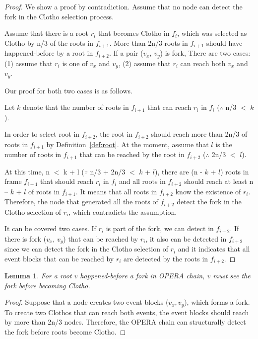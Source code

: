 \documentclass{article}
\newtheorem{lem}[thm]{Lemma}
\begin{document}
\begin{proof}
We show a proof by contradiction. Assume that no node can detect the fork in the Clotho selection process.

Assume that there is a root $r_i$ that becomes Clotho in $f_i$, which was selected as Clotho by n/3 of the roots in $f_{i+1}$. More than 2n/3 roots in $f_{i+1}$ should have happened-before by a root in $f_{i+2}$. 
If a pair ($v_x$, $v_y$) is fork, There are two cases: (1) assume that $r_i$ is one of $v_x$ and $v_y$, (2) assume that $r_i$ can reach both $v_x$ and $v_y$.

Our proof for both two cases is as follows. 

Let $k$ denote that the number of roots in $f_{i+1}$ that can reach $r_i$ in $f_{i}$ ($\therefore$ n/3 $<$ $k$).

In order to select root in $f_{i+2}$, the root in $f_{i+2}$ should reach more than 2n/3 of roots in $f_{i+1}$ by Definition~\ref{def:root}. At the moment, assume that $l$ is the number of roots in $f_{i+1}$ that can be reached by the root in $f_{i+2}$ ($\therefore$ 2n/3 $<$ $l$).

At this time, n $<$ k + l ($\because$ n/3 + 2n/3 $<$ $k$ + $l$), there are (n - $k$ + $l$) roots in frame $f_{i+1}$ that should reach $r_i$ in $f_i$ and all roots in $f_{i+2}$ should reach at least n – $k$ + $l$ of roots in $f_{i+1}$. It means that all roots in $f_{i+2}$ know the existence of $r_i$. Therefore, the node that generated all the roots of $f_{i+2}$ detect the fork in the Clotho selection of $r_i$, which contradicts the assumption.

It can be covered two cases. If $r_i$ is part of the fork, we can detect in $f_{i+2}$. If there is fork ($v_x$, $v_y$) that can be reached by $r_i$, it also can be detected in $f_{i+2}$ since we can detect the fork in the Clotho selection of $r_i$ and it indicates that all event blocks that can be reached by $r_i$ are detected by the roots in $f_{i+2}$.
\end{proof}

\begin{lem}
	For a root $v$ happened-before a fork in OPERA chain, $v$ must see the fork before becoming Clotho.
\end{lem}

\begin{proof}
	Suppose that a node creates two event blocks ($v_x, v_y$), which forms a fork. To create two Clothos that can reach both events, the event blocks should reach by more than 2n/3 nodes. Therefore, the OPERA chain can structurally detect the fork before roots become Clotho.
\end{proof}
\end{document}
